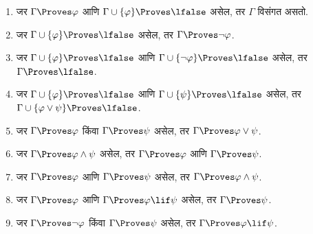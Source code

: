 \begin{prop} \begin{enumerate}
\item \label{fol:axd:prv-alt:prop:provability-contr} जर $\Gamma \Proves \varphi$ आणि $\Gamma
\cup \{ \varphi\} \Proves \lfalse$ असेल, तर $\Gamma$ विसंगत असतो.

\item \label{fol:axd:prv-alt:prop:provability-lnot} जर $\Gamma \cup \{\varphi\}
\Proves \lfalse$ असेल, तर $\Gamma \Proves \lnot \varphi$.

\item \label{fol:axd:prv-alt:prop:provability-exhaustive} जर $\Gamma \cup \{\varphi\}
\Proves \lfalse$ आणि $\Gamma \cup \{\lnot \varphi\} \Proves
\lfalse$ असेल, तर $\Gamma \Proves \lfalse$.

\item \label{fol:axd:prv-alt:prop:provability-lor-left} जर $\Gamma \cup \{\varphi\}
\Proves \lfalse$ आणि $\Gamma \cup \{\psi\} \Proves
\lfalse$ असेल, तर $\Gamma \cup \{\varphi \lor \psi\} \Proves \lfalse$.

\item \label{fol:axd:prv-alt:prop:provability-lor-right} जर $\Gamma
\Proves \varphi$ किंवा $\Gamma \Proves \psi$ असेल, तर $\Gamma
\Proves \varphi \lor \psi$.

\item \label{fol:axd:prv-alt:prop:provability-land-left} जर $\Gamma
\Proves \varphi \land \psi$ असेल, तर $\Gamma \Proves \varphi$ आणि
$\Gamma \Proves \psi$.

\item \label{fol:axd:prv-alt:prop:provability-land-right} जर $\Gamma
\Proves \varphi$ आणि $\Gamma \Proves \psi$ असेल, तर $\Gamma
\Proves \varphi \land \psi$.

\item \label{fol:axd:prv-alt:prop:provability-mp} जर $\Gamma \Proves
\varphi$ आणि $\Gamma \Proves \varphi \lif \psi$ असेल, तर $\Gamma
\Proves \psi$.

\item \label{fol:axd:prv-alt:prop:provability-lif} जर $\Gamma \Proves
\lnot \varphi$ किंवा $\Gamma \Proves \psi$ असेल, तर $\Gamma \Proves
\varphi \lif \psi$. \end{enumerate} \end{prop}


